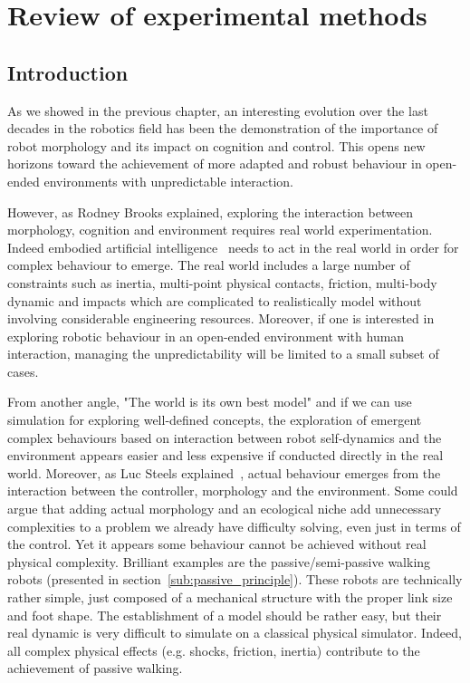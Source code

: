 
\cleartoleftpage

\chapter{Review of experimental methods} %
\label{cha:experimental-methods}



\section{Introduction} %
\label{sec:platform-introduction}

As we showed in the previous chapter, an interesting evolution over the last decades in the robotics field has been the demonstration of the importance of robot morphology and its impact on cognition and control. This opens new horizons toward the achievement of more adapted and robust behaviour in open-ended environments with unpredictable interaction.

However, as Rodney Brooks explained, exploring the interaction between morphology, cognition and environment requires real world experimentation. Indeed embodied artificial intelligence~\parencite{Pfeifer07} needs to act in the real world in order for  complex behaviour to emerge. The real world includes a large number of constraints such as inertia, multi-point physical contacts, friction, multi-body dynamic and impacts which are complicated to realistically model without involving considerable engineering resources. Moreover, if one is interested in exploring robotic behaviour in an open-ended environment with human interaction, managing the unpredictability will be limited to a small subset of cases.

From another angle, "The world is its own best model" and if we can use simulation for exploring well-defined concepts, the exploration of emergent complex behaviours based on interaction between robot self-dynamics and the environment appears easier and less expensive if conducted directly in the real world.
Moreover, as Luc Steels explained~\parencite{Steels1991emergence}, actual behaviour emerges from the interaction between the controller, morphology and the environment. Some could argue that adding actual morphology and an ecological niche add unnecessary complexities to a problem we already have difficulty solving, even just in terms of the control. Yet it appears some behaviour cannot be achieved without real physical complexity. Brilliant examples are the passive/semi-passive walking robots (presented in section~\ref{sub:passive_principle}). These robots are technically rather simple, just composed of a mechanical structure with the proper link size and foot shape. The establishment of a model should be rather easy, but their real dynamic is very difficult to simulate on a classical physical simulator. Indeed, all complex physical effects (e.g. shocks, friction, inertia) contribute to the achievement of passive walking.


